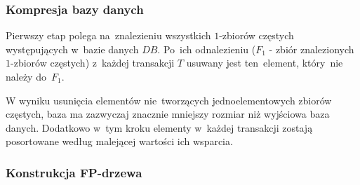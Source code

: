 \subsubsection{Kompresja bazy danych}
Pierwszy etap polega na~znalezieniu wszystkich $1$-zbiorów częstych występujących w~bazie danych $DB$. Po~ich odnalezieniu ($F_1$ - zbiór znalezionych $1$-zbiorów częstych) z~każdej transakcji $T$ usuwany jest ten~element, który~nie należy do~$F_1$. 

W wyniku usunięcia elementów nie~tworzących jednoelementowych zbiorów częstych, baza ma zazwyczaj znacznie mniejszy rozmiar niż wyjściowa baza danych. Dodatkowo w~tym kroku elementy w~każdej transakcji zostają posortowane według malejącej wartości ich wsparcia.

\subsubsection{Konstrukcja FP-drzewa}\label{fptree:construction}
